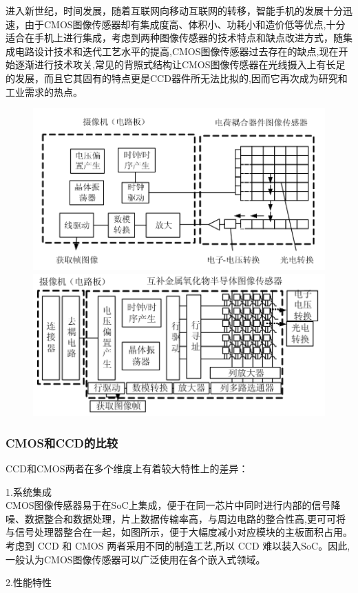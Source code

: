 进入新世纪，时间发展，随着互联网向移动互联网的转移，智能手机的发展十分迅速，由于CMOS图像传感器却有集成度高、体积小、功耗小和造价低等优点,十分适合在手机上进行集成，考虑到两种图像传感器的技术特点和缺点改进方式，随集成电路设计技术和迭代工艺水平的提高,CMOS图像传感器过去存在的缺点,现在开始逐渐进行技术攻关,常见的背照式结构让CMOS图像传感器在光线摄入上有长足的发展，而且它其固有的特点更是CCD器件所无法比拟的,因而它再次成为研究和工业需求的热点。

\begin{figure}[h]
\centering
\includegraphics[width=0.7\linewidth]{Figure/CCD_1}
\includegraphics[width=0.7\linewidth]{Figure/CMOS_1}
\caption{}
\label{fig:CCD_1}
\end{figure}

\subsubsection{CMOS和CCD的比较}
CCD和CMOS两者在多个维度上有着较大特性上的差异：

1.系统集成 \\

CMOS图像传感器易于在SoC上集成，便于在同一芯片中同时进行内部的信号降噪、数据整合和数据处理，片上数据传输率高，与周边电路的整合性高,更可可将与信号处理器整合在一起，如图所示，便于大幅度减小对应模块的主板面积占用。考虑到 CCD 和 CMOS 两者采用不同的制造工艺,所以 CCD 难以装入SoC。因此,一般认为CMOS图像传感器可以广泛使用在各个嵌入式领域。

2.性能特性\\

